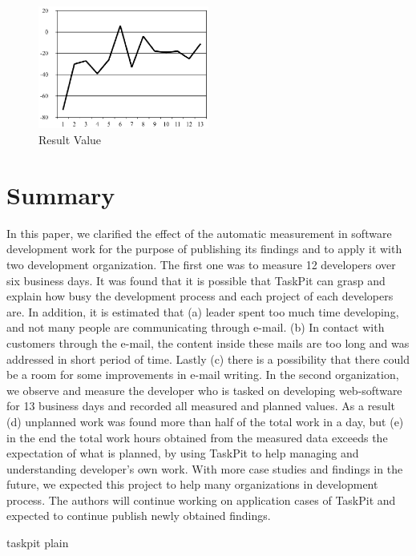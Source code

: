 \documentclass [paper]{ieice}
\begin{document}
\begin{figure}[h]
	\centering	
\includegraphics[width=0.5\textwidth]{fig14}
	\caption{Result Value}
	\label{fig14}
\end{figure}

\section{Summary}
	In this paper, we clarified the effect of the automatic measurement in software development work for the purpose of publishing its findings and to apply it with two development organization. The first one was to measure 12 developers over six business days. It was found that it is possible that TaskPit can grasp and explain how busy the development process and each project of each developers are. In addition, it is estimated that (a) leader spent too much time developing, and not many people are communicating through e-mail. (b) In contact with customers through the e-mail, the content inside these mails are too long and was addressed in short period of time. Lastly (c) there is a possibility that there could be a room for some improvements in e-mail writing.
	In the second organization, we observe and measure the developer who is tasked on developing web-software for 13 business days and recorded all measured and planned values. As a result (d) unplanned work was found more than half of the total work in a day, but (e) in the end the total work hours obtained from the measured data exceeds the expectation of what is planned, by using TaskPit to help managing and understanding developer's own work.
	With more case studies and findings in the future, we expected this project to help many organizations in development process. The authors will continue working on application cases of TaskPit and expected to continue publish newly obtained findings.

 {taskpit}
 {plain}
	
\end{document}
